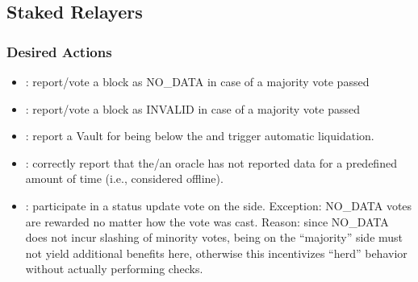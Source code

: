 \documentclass[a4paper,10pt,english]{sphinxmanual}
\begin{document}
\subsection{Staked Relayers}
\label{\detokenize{economics/SLA:id7}}

\subsubsection{Desired Actions}
\label{\detokenize{economics/SLA:id8}}\begin{itemize}
\item {} 
: report/vote a block as NO\_DATA in case of a majority vote passed

\item {} 
: report/vote a block as INVALID in case of a majority vote passed

\item {} 
: report a Vault for being below the  and trigger automatic liquidation.

\item {} 
: correctly report that the/an oracle has not reported data for a pre\sphinxhyphen{}defined amount of time (i.e., considered offline).

\item {} 
: participate in a status update vote on the  side.
\sphinxhyphen{} Exception: NO\_DATA votes are rewarded no matter how the vote was cast. Reason: since NO\_DATA does not incur slashing of minority votes, being on the “majority” side must not yield additional benefits here, otherwise this incentivizes “herd” behavior without actually performing checks.

\end{itemize}
\end{document}
